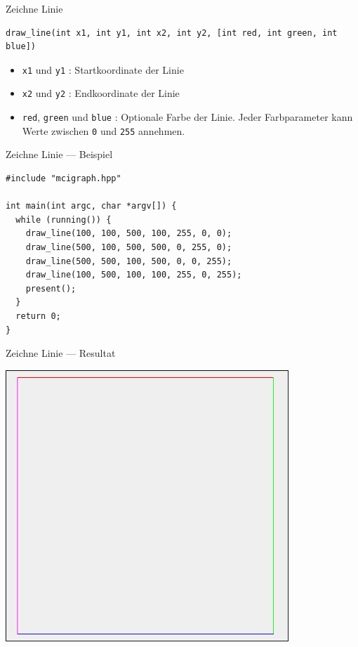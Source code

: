 \documentclass[presentation]{beamer}
\begin{document}
\begin{frame}[label={sec:org2fd1606},fragile]{Zeichne Linie}
 \begin{verbatim}
draw_line(int x1, int y1, int x2, int y2, [int red, int green, int blue])
\end{verbatim}
\begin{itemize}
\item {\color{solarizedYellow}\texttt{x1} }und {\color{solarizedYellow}\texttt{y1} }: Startkoordinate der Linie
\item {\color{solarizedYellow}\texttt{x2} }und {\color{solarizedYellow}\texttt{y2} }: Endkoordinate der Linie
\item {\color{solarizedYellow}\texttt{red}}, {\color{solarizedYellow}\texttt{green} }und {\color{solarizedYellow}\texttt{blue} }: Optionale Farbe der Linie. Jeder
Farbparameter kann Werte zwischen {\color{solarizedYellow}\texttt{0} }und {\color{solarizedYellow}\texttt{255} }annehmen.
\end{itemize}
\end{frame}
\begin{frame}[label={sec:org0d293c4},fragile]{Zeichne Linie --- Beispiel}
 \begin{verbatim}
#include "mcigraph.hpp"

int main(int argc, char *argv[]) {
  while (running()) {
    draw_line(100, 100, 500, 100, 255, 0, 0);
    draw_line(500, 100, 500, 500, 0, 255, 0);
    draw_line(500, 500, 100, 500, 0, 0, 255);
    draw_line(100, 500, 100, 100, 255, 0, 255);
    present();
  }
  return 0;
}
\end{verbatim}
\end{frame}
\begin{frame}[label={sec:org50f563b}]{Zeichne Linie --- Resultat}
\begin{center}\begin{center}
\includegraphics[width=0.8\textwidth]{data/67/54d5a4-1fe1-408b-ba0f-9b700d82c738/screenshot-20170314-211231.png}
\end{center}\end{center}
\end{frame}
\end{document}
